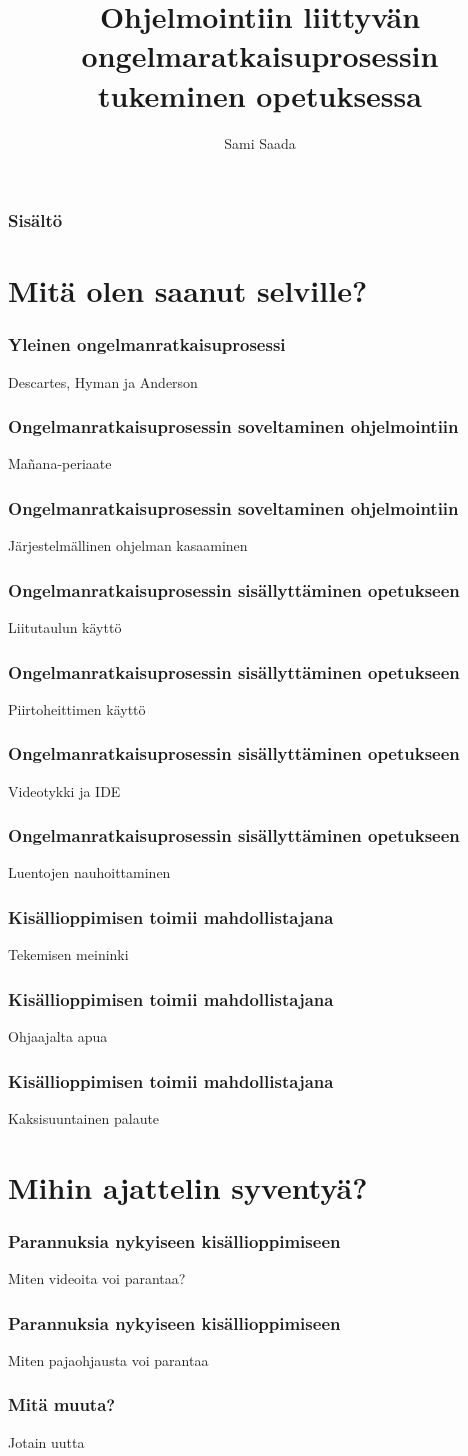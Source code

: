 \documentclass[finnish]{beamer}
\author{Sami Saada}
\title{Ohjelmointiin liittyvän ongelmaratkaisuprosessin tukeminen opetuksessa}
\institute{Tietojenkäsittelytieteen laitos}
\begin{document}
\HyTitle

\frame
{
  \frametitle{Sisältö}
  \tableofcontents
}

\section{Mitä olen saanut selville?}

\frame
{
  \frametitle{Yleinen ongelmanratkaisuprosessi}

  Descartes, Hyman ja Anderson
}

\frame
{
  \frametitle{Ongelmanratkaisuprosessin soveltaminen ohjelmointiin}

  Mañana-periaate
}

\frame
{
  \frametitle{Ongelmanratkaisuprosessin soveltaminen ohjelmointiin}

  Järjestelmällinen ohjelman kasaaminen
}

\frame
{
  \frametitle{Ongelmanratkaisuprosessin sisällyttäminen opetukseen}

  Liitutaulun käyttö
}

\frame
{
  \frametitle{Ongelmanratkaisuprosessin sisällyttäminen opetukseen}

  Piirtoheittimen käyttö
}

\frame
{
  \frametitle{Ongelmanratkaisuprosessin sisällyttäminen opetukseen}

  Videotykki ja IDE
}

\frame
{
  \frametitle{Ongelmanratkaisuprosessin sisällyttäminen opetukseen}

  Luentojen nauhoittaminen
}

\frame
{
  \frametitle{Kisällioppimisen toimii mahdollistajana}

  Tekemisen meininki
}

\frame
{
  \frametitle{Kisällioppimisen toimii mahdollistajana}

  Ohjaajalta apua
}

\frame
{
  \frametitle{Kisällioppimisen toimii mahdollistajana}

  Kaksisuuntainen palaute
}

\section{Mihin ajattelin syventyä?}

\frame
{
  \frametitle{Parannuksia nykyiseen kisällioppimiseen}

  Miten videoita voi parantaa?
}

\frame
{
  \frametitle{Parannuksia nykyiseen kisällioppimiseen}

  Miten pajaohjausta voi parantaa
}

\frame
{
  \frametitle{Mitä muuta?}

  Jotain uutta
}
\end{document}
